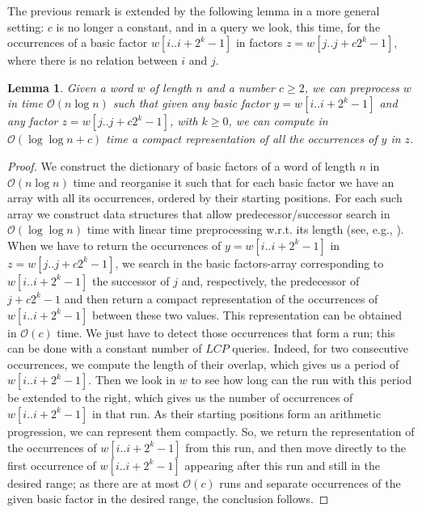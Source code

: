 \documentclass[final]{dmtcs-episciences}
\newcommand{\bigo}{{\mathcal O}}
\newcommand{\LCP}{{\mathit{LCP}}}
\newtheorem{lemma}{Lemma}
\begin{document}
The previous remark is extended by the following lemma in a more general setting: $c$ is no longer a constant, and in a query we look, this time, for the occurrences of a basic factor $w[i..i+2^k-1]$ in factors $z=w[j..j+c 2^k -1]$, where there is no relation between $i$ and $j$. 
\begin{lemma}\label{find_occ_range}
Given a word $w$ of length $n$ and a number $c\geq 2$, we can preprocess $w$ in time $\bigo(n\log n)$ such that given any basic factor $y=w[i..i+2^k-1]$ and any factor $z=w[j..j+c 2^k -1]$, with $k\geq 0$, we can compute in $\bigo(\log \log n + c)$ time a compact representation of all the occurrences of $y$ in $z$.
\end{lemma}
\begin{proof}
We construct the dictionary of basic factors of a word of length $n$ in $\bigo(n\log n)$ time and reorganise it such that for each basic factor we have an array with all its occurrences, ordered by their starting positions. For each such array we construct data structures that allow predecessor/successor search in $\bigo(\log\log n)$ time with linear time preprocessing w.r.t. its length (see, e.g., \cite{Boas75}). When we have to return the occurrences of $y=w[i..i+2^k-1]$ in $z=w[j..j+c 2^k -1]$, we search in the basic factors-array corresponding to $w[i..i+2^k-1]$ the successor of $j$ and, respectively, the predecessor of $j+c2^k -1$ and then return a compact representation of the occurrences of $w[i..i+2^k-1]$ between these two values. This representation can be obtained in $\bigo(c)$ time. We just have to detect those occurrences that form a run; this can be done with a constant number of $\LCP$ queries. Indeed, for two consecutive occurrences, we compute the length of their overlap, which gives us a period of $w[i..i+2^k-1]$. Then we look in $w$ to see how long can the run with this period be extended to the right, which gives us the number of occurrences of  $w[i..i+2^k-1]$ in that run. As their starting positions form an arithmetic progression, we can represent them compactly. So, we return the representation of the occurrences of $w[i..i+2^k-1]$ from this run, and then move directly to the first occurrence of $w[i..i+2^k-1]$ appearing after this run and still in the desired range; as there are at most $\bigo(c)$ runs and separate occurrences of the given basic factor in the desired range, the conclusion follows.
\end{proof}
\end{document}
